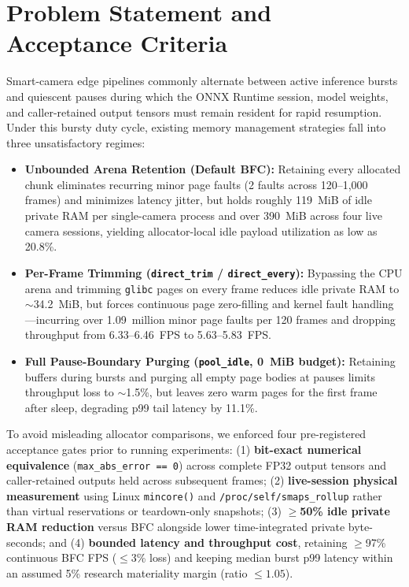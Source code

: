 \documentclass[sigconf,screen,nonacm]{acmart}
\begin{document}
\section{Problem Statement and Acceptance Criteria}
Smart-camera edge pipelines commonly alternate between active inference bursts and quiescent pauses during which the ONNX Runtime session, model weights, and caller-retained output tensors must remain resident for rapid resumption. Under this bursty duty cycle, existing memory management strategies fall into three unsatisfactory regimes:

\begin{itemize}
  \item \textbf{Unbounded Arena Retention (Default BFC):} Retaining every allocated chunk eliminates recurring minor page faults (2 faults across 120--1,000 frames) and minimizes latency jitter, but holds roughly 119~MiB of idle private RAM per single-camera process and over 390~MiB across four live camera sessions, yielding allocator-local idle payload utilization as low as 20.8\%.
  \item \textbf{Per-Frame Trimming (\texttt{direct\_trim} / \texttt{direct\_every}):} Bypassing the CPU arena and trimming \texttt{glibc} pages on every frame reduces idle private RAM to $\sim$34.2~MiB, but forces continuous page zero-filling and kernel fault handling---incurring over 1.09~million minor page faults per 120 frames and dropping throughput from 6.33--6.46~FPS to 5.63--5.83~FPS.
  \item \textbf{Full Pause-Boundary Purging (\texttt{pool\_idle}, 0~MiB budget):} Retaining buffers during bursts and purging all empty page bodies at pauses limits throughput loss to $\sim$1.5\%, but leaves zero warm pages for the first frame after sleep, degrading p99 tail latency by 11.1\%.
\end{itemize}

To avoid misleading allocator comparisons, we enforced four pre-registered acceptance gates prior to running experiments: (1) \textbf{bit-exact numerical equivalence} (\texttt{max\_abs\_error == 0}) across complete FP32 output tensors and caller-retained outputs held across subsequent frames; (2) \textbf{live-session physical measurement} using Linux \texttt{mincore()} and \texttt{/proc/self/smaps\_rollup} rather than virtual reservations or teardown-only snapshots; (3) \textbf{$\ge$50\% idle private RAM reduction} versus BFC alongside lower time-integrated private byte-seconds; and (4) \textbf{bounded latency and throughput cost}, retaining $\ge$97\% continuous BFC FPS ($\le$3\% loss) and keeping median burst p99 latency within an assumed 5\% research materiality margin (ratio $\le 1.05$).
\end{document}
